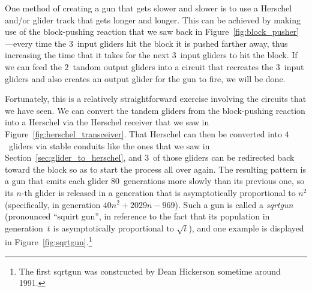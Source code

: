 One method of creating a gun that gets slower and slower is to use a Herschel and/or glider track that gets longer and longer. This can be achieved by making use of the block-pushing reaction that we saw back in Figure~\ref{fig:block_pusher}---every time the $3$~input gliders hit the block it is pushed farther away, thus increasing the time that it takes for the next $3$~input gliders to hit the block. If we can feed the $2$~tandom output gliders into a circuit that recreates the $3$~input gliders and also creates an output glider for the gun to fire, we will be done.

Fortunately, this is a relatively straightforward exercise involving the circuits that we have seen. We can convert the tandem gliders from the block-pushing reaction into a Herschel via the Herschel receiver that we saw in Figure~\ref{fig:herschel_transceiver}. That Herschel can then be converted into $4$~gliders via stable conduits like the ones that we saw in Section~\ref{sec:glider_to_herschel}, and $3$~of those gliders can be redirected back toward the block so as to start the process all over again. The resulting pattern is a gun that emits each glider $80$~generations more slowly than its previous one, so its $n$-th glider is released in a generation that is asymptotically proportional to $n^2$ (specifically, in generation $40n^2 + 2029n - 969$). Such a gun is called a \emph{sqrtgun} (pronounced ``squirt gun'', in reference to the fact that its population in generation~$t$ is asymptotically proportional to $\sqrt{t}$), and one example is displayed in Figure~\ref{fig:sqrtgun}.\footnote{The first sqrtgun was constructed by Dean Hickerson sometime around 1991.}

